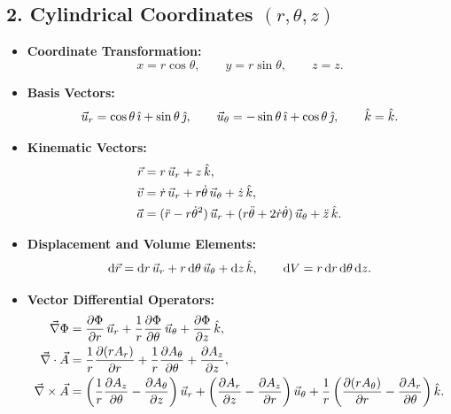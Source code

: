 \subsection{2. Cylindrical Coordinates $(r, \theta, z)$}
\begin{itemize}[leftmargin=1.5em,itemsep=3pt]
  \item \textbf{Coordinate Transformation:}
  \[
  x = r\cos\theta, \qquad y = r\sin\theta, \qquad z = z.
  \]
  \item \textbf{Basis Vectors:}
  \[
  \vec{u}_r = \cos\theta\,\hat{\imath} + \sin\theta\,\hat{\jmath}, \qquad \vec{u}_\theta = -\sin\theta\,\hat{\imath} + \cos\theta\,\hat{\jmath}, \qquad \hat{k} = \hat{k}.
  \]
  \item \textbf{Kinematic Vectors:}
  \begin{align*}
  \vec{r} &= r\,\vec{u}_r + z\,\hat{k}, \\
  \vec{v} &= \dot{r}\,\vec{u}_r + r\dot{\theta}\,\vec{u}_\theta + \dot{z}\,\hat{k}, \\
  \vec{a} &= (\ddot{r} - r\dot{\theta}^2)\,\vec{u}_r + (r\ddot{\theta} + 2\dot{r}\dot{\theta})\,\vec{u}_\theta + \ddot{z}\,\hat{k}.
  \end{align*}
  \item \textbf{Displacement and Volume Elements:}
  \[
  \mathrm{d}\vec{r} = \mathrm{d} r\,\vec{u}_r + r\,\mathrm{d}\theta\,\vec{u}_\theta + \mathrm{d} z\,\hat{k}, \qquad \mathrm{d} V = r\,\mathrm{d} r\,\mathrm{d}\theta\,\mathrm{d} z.
  \]
  \item \textbf{Vector Differential Operators:}
  \begin{align*}
  \vec{\nabla} \Phi &= \frac{\partial\Phi}{\partial r}\,\vec{u}_r + \frac{1}{r}\frac{\partial\Phi}{\partial\theta}\,\vec{u}_\theta + \frac{\partial\Phi}{\partial z}\,\hat{k}, \\
  \vec{\nabla} \cdot \vec{A} &= \frac{1}{r}\frac{\partial(r A_r)}{\partial r} + \frac{1}{r}\frac{\partial A_\theta}{\partial\theta} + \frac{\partial A_z}{\partial z}, \\
  \vec{\nabla} \times \vec{A} &= \left(\frac{1}{r}\frac{\partial A_z}{\partial\theta} - \frac{\partial A_\theta}{\partial z}\right)\vec{u}_r + \left(\frac{\partial A_r}{\partial z} - \frac{\partial A_z}{\partial r}\right)\vec{u}_\theta + \frac{1}{r}\left(\frac{\partial(r A_\theta)}{\partial r} - \frac{\partial A_r}{\partial\theta}\right)\hat{k}.
  \end{align*}
\end{itemize}

